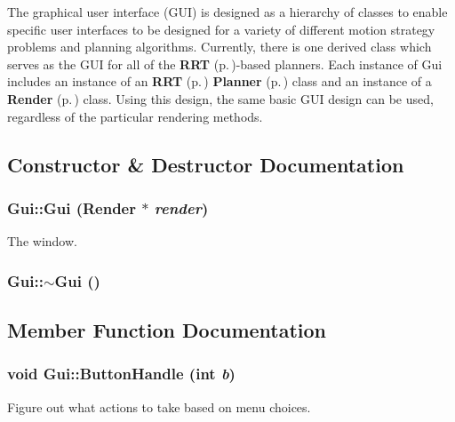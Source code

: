 The graphical user interface (GUI) is designed as a hierarchy of classes to enable specific user interfaces to be designed for a variety of different motion strategy problems and planning algorithms. Currently, there is one derived class which serves as the GUI for all of the {\bf RRT} {\rm (p.\,\pageref{class_RRT})}-based planners. Each instance of Gui includes an instance of an {\bf RRT} {\rm (p.\,\pageref{class_RRT})} {\bf Planner} {\rm (p.\,\pageref{class_Planner})} class and an instance of a {\bf Render} {\rm (p.\,\pageref{class_Render})} class. Using this design, the same basic GUI design can be used, regardless of the particular rendering methods. 



\subsection{Constructor \& Destructor Documentation}
\subsubsection{\setlength{\rightskip}{0pt plus 5cm}Gui::Gui ({\bf Render} $\ast$ {\em render})}\label{class_Gui_a0}


The window.

\subsubsection{\setlength{\rightskip}{0pt plus 5cm}Gui::$\sim$Gui ()\hspace{0.3cm}{\tt  [inline, virtual]}}\label{class_Gui_a1}




\subsection{Member Function Documentation}
\subsubsection{\setlength{\rightskip}{0pt plus 5cm}void Gui::Button\-Handle (int {\em b})\hspace{0.3cm}{\tt  [inline, virtual]}}\label{class_Gui_a4}


Figure out what actions to take based on menu choices.



